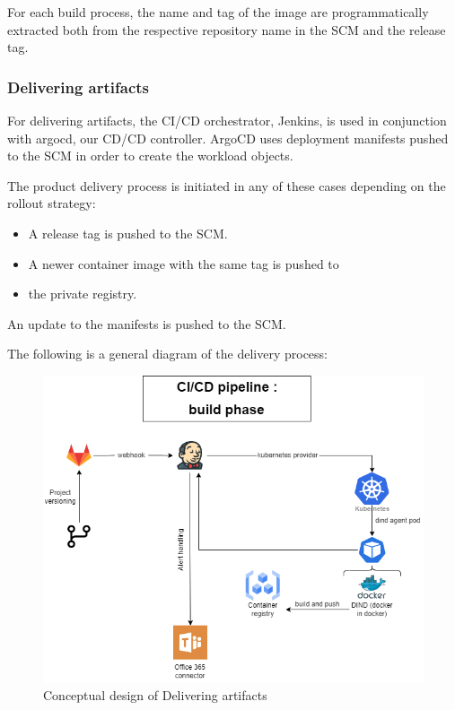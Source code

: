 For each build process, the name and tag of the image are programmatically extracted both from the respective repository name in the SCM and the release tag. 

 

\subsubsection{Delivering artifacts }


For delivering artifacts, the CI/CD orchestrator, Jenkins, is used in conjunction with argocd, our CD/CD controller. ArgoCD uses deployment manifests pushed to the SCM in order to create the workload objects. 

The product delivery process is initiated in any of these cases depending on the rollout strategy: 

\begin{itemize}[label={--}]
\item A release tag is pushed to the SCM. 
\item A newer container image with the same tag is pushed to \item the private registry. 
\end{itemize}

An update to the manifests is pushed to the SCM. 

The following is a general diagram of the delivery process: 

\begin{figure}[H]\centering
\includegraphics[width=1.0\textwidth,angle=00]{assets/f49.png}
\caption{Conceptual design of Delivering artifacts }
\label{fig:Conceptual design of Delivering artifacts }
\end{figure}

